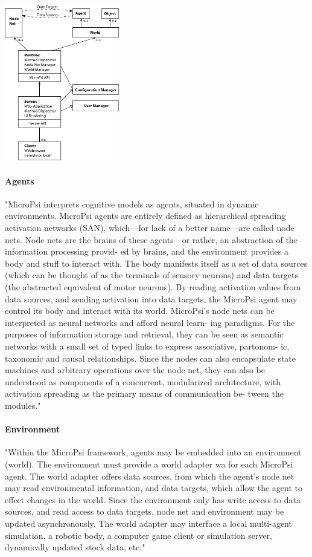             \includegraphics[width=5cm]{graphics/micropsi2_uml}
            
            \paragraph{Agents}
"MicroPsi interprets cognitive models as agents, situated in dynamic environments. MicroPsi agents are entirely defined as hierarchical spreading activation networks (SAN), which—for lack of a better name—are called node nets. Node nets are the brains of these agents—or rather, an abstraction of the information processing provid- ed by brains, and the environment provides a body and stuff to interact with.
The body manifests itself as a set of data sources (which can be thought of as the terminals of sensory neurons) and data targets (the abstracted equivalent of motor neurons). By reading activation values from data sources, and sending activation into data targets, the MicroPsi agent may control its body and interact with its world.
MicroPsi’s node nets can be interpreted as neural networks and afford neural learn- ing paradigms. For the purposes of information storage and retrieval, they can be seen as semantic networks with a small set of typed links to express associative, partonom- ic, taxonomic and causal relationships.
Since the nodes can also encapsulate state machines and arbitrary operations over the node net, they can also be understood as components of a concurrent, modularized architecture, with activation spreading as the primary means of communication be- tween the modules."~\cite{conf/agi/Bach12}

            \paragraph{Environment}
"Within the MicroPsi framework, agents may be embedded into an environment (world). The environment must provide a world adapter wa for each MicroPsi agent. The world adapter offers data sources, from which the agent’s node net may read environmental information, and data targets, which allow the agent to effect changes in the world. Since the environment only has write access to data sources, and read access to data targets, node net and environment may be updated asynchronously.
The world adapter may interface a local multi-agent simulation, a robotic body, a computer game client or simulation server, dynamically updated stock data, etc."~\cite{conf/agi/Bach12}

